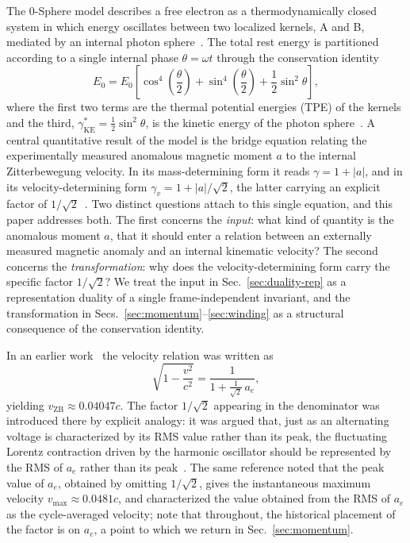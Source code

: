 \documentclass[%
 reprint, amsmath,amssymb, aps, prb, ]{revtex4-2}
\numberwithin{equation}{section}
\newcommand{\vZB}{v_{\text{ZB}}}
\newcommand{\gKE}{\gamma^{*}_{\text{KE}}}
\begin{document}
The 0-Sphere model describes a free electron as a thermodynamically closed system in which energy oscillates between two localized kernels, A and B, mediated by an internal photon sphere~\cite{hanamura01}. The total rest energy is partitioned according to a single internal phase $\theta=\omega t$ through the conservation identity
\begin{equation}
E_0 = E_0\!\left[\cos^4\!\left(\frac{\theta}{2}\right) + \sin^4\!\left(\frac{\theta}{2}\right) + \frac{1}{2}\sin^2\theta\right],
\label{eq:identity}
\end{equation}
where the first two terms are the thermal potential energies (TPE) of the kernels and the third, $\gKE=\tfrac{1}{2}\sin^2\theta$, is the kinetic energy of the photon sphere~\cite{hanamura01}. A central quantitative result of the model is the bridge equation relating the experimentally measured anomalous magnetic moment $a$ to the internal Zitterbewegung velocity. In its mass-determining form it reads $\gamma = 1 + \lvert a\rvert$, and in its velocity-determining form $\gamma_v = 1 + \lvert a\rvert/\sqrt{2}$, the latter carrying an explicit factor of $1/\sqrt{2}$~\cite{hanamura10,hanamura61}. Two distinct questions attach to this single equation, and this paper addresses both. The first concerns the \emph{input}: what kind of quantity is the anomalous moment $a$, that it should enter a relation between an externally measured magnetic anomaly and an internal kinematic velocity? The second concerns the \emph{transformation}: why does the velocity-determining form carry the specific factor $1/\sqrt{2}$? We treat the input in Sec.~\ref{sec:duality-rep} as a representation duality of a single frame-independent invariant, and the transformation in Secs.~\ref{sec:momentum}--\ref{sec:winding} as a structural consequence of the conservation identity.

In an earlier work~\cite{hanamura10} the velocity relation was written as
\begin{equation}
\sqrt{1-\frac{v^2}{c^2}} = \frac{1}{1+\frac{1}{\sqrt{2}}\,a_e},
\label{eq:bridge}
\end{equation}
yielding $\vZB \approx 0.04047c$. The factor $1/\sqrt{2}$ appearing in the denominator was introduced there by explicit analogy: it was argued that, just as an alternating voltage is characterized by its RMS value rather than its peak, the fluctuating Lorentz contraction driven by the harmonic oscillator should be represented by the RMS of $a_e$ rather than its peak~\cite{hanamura10}. The same reference noted that the peak value of $a_e$, obtained by omitting $1/\sqrt{2}$, gives the instantaneous maximum velocity $v_{\max}\approx 0.0481c$, and characterized the value obtained from the RMS of $a_e$ as the cycle-averaged velocity; note that throughout, the historical placement of the factor is on $a_e$, a point to which we return in Sec.~\ref{sec:momentum}.
\end{document}
